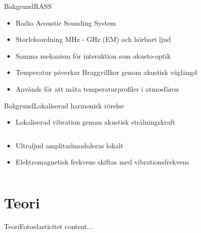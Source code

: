 \documentclass[11pt]{beamer}
\begin{document}
	\begin{frame}{Bakgrund}{RASS}
		\begin{itemize}
			\item Radio Acoustic Sounding System
			\pause
			\item Storleksordning MHz - GHz (EM) och hörbart ljud
			\pause
			\item Samma mekanism för interaktion som akusto-optik
			\pause
			\item Temperatur påverkar Braggvillkor genom akustisk våglängd
			\pause
			\item Används för att mäta temperaturprofiler i atmosfären
		\end{itemize}
	\end{frame}

	\begin{frame}{Bakgrund}{Lokaliserad harmonisk rörelse}
		\begin{itemize}
			\item<1-> Lokaliserad vibration genom akustisk strålningskraft
		\end{itemize}
		\begin{columns}
			\begin{column}{0.45\textwidth}
				\begin{itemize}
					\item<2-> Ultraljud amplitudmoduleras lokalt
					\item<3-> Elektromagnetisk frekvens skiftas med vibrationsfrekvens
				\end{itemize}
			\end{column}
			\begin{column}{0.3\textwidth}
				\uncover<2->{
					\resizebox{!}{0.5\textheight}{
						
					}
				}
			\end{column}
			\hspace{0.05\textwidth}
			\begin{column}{0.2\textwidth}
				\uncover<2->{
					\resizebox{!}{0.5\textheight}{
						
					}
				}
			\end{column}
		\end{columns}
	\end{frame}
	
	\section{Teori}
	
	\begin{frame}{Teori}{Fotoelasticitet}
		content...
	\end{frame}
	
\end{document}
